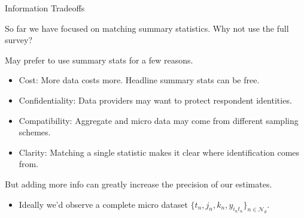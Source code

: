 \documentclass[aspectratio=169,t,11pt,table]{beamer}
\begin{document}
\begin{frame}{Information Tradeoffs}
    \begin{wideitemize}
        \item So far we have focused on matching summary statistics. Why not use the full survey?
        \pause
        \item May prefer to use summary stats for a few reasons.
        \pause
        \begin{itemize}
            \item \alert{Cost}: More data costs more. Headline summary stats can be free.
            \pause
            \item \alert{Confidentiality}: Data providers may want to protect respondent identities.
            \pause
            \item \alert{Compatibility}: Aggregate and micro data may come from different sampling schemes.
            \pause
            \item \alert{Clarity}: Matching a single statistic makes it clear where identification comes from.
        \end{itemize}
        \pause
        \item But adding more info can greatly increase the precision of our estimates.
        \begin{itemize}
            \item Ideally we'd observe a complete micro dataset $\{t_n, j_n, k_n, y_{i_nt_n}\}_{n \in \mathcal{N}_d}$.
        \end{itemize}
    \end{wideitemize}
\end{frame}
\end{document}
